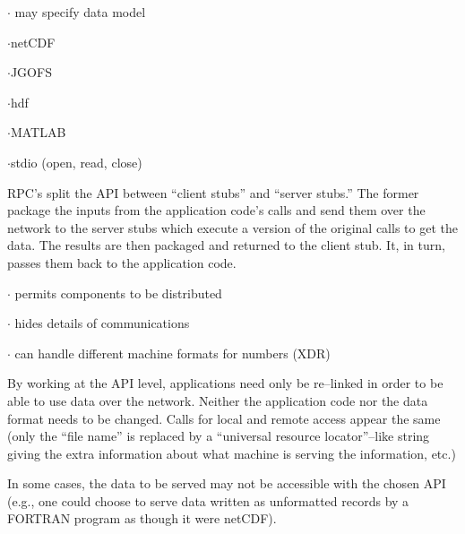\item{$\cdot$} may specify data model


\item{$\cdot$}netCDF

\item{$\cdot$}JGOFS

\item{$\cdot$}hdf

\item{$\cdot$}MATLAB

\item{$\cdot$}stdio (open, read, close)

\vfill\eject


RPC's split the API between ``client stubs'' and ``server stubs.'' The
former package the inputs from the application code's calls and send
them over the network to the server stubs which execute a version of
the original calls to get the data. The results are then packaged and
returned to the client stub.  It, in turn, passes them back to the
application code.

\item{$\cdot$} permits components to be distributed

\item{$\cdot$} hides details of communications

\item{$\cdot$} can handle different machine formats for numbers (XDR)


By working at the API level, applications need only be re--linked in
order to be able to use data over the network. Neither the application
code nor the data format needs to be changed. Calls for local and
remote access appear the same (only the ``file name'' is replaced by a
``universal resource locator''--like string giving the extra
information about what machine is serving the information, etc.)

\vfill\eject


In some cases, the data to be served may not be accessible with the
chosen API (e.g., one could choose to serve data written as
unformatted records by a FORTRAN program as though it were netCDF). 

\vfill\eject


